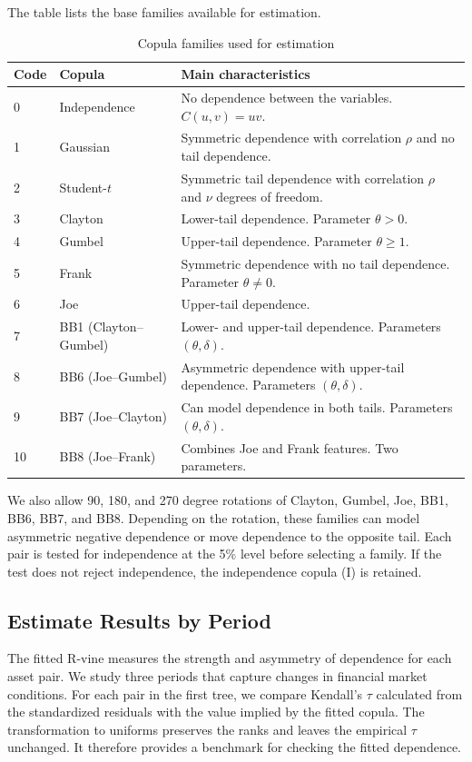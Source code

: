 \documentclass[12pt,a4paper]{article}
\begin{document}
The table lists the base families available for estimation.

\begin{table}[H]
\centering
\small
\begin{tabular}{llp{8cm}}
\toprule
Code & Copula & Main characteristics \\
\midrule
0 & Independence & No dependence between the variables. $C(u,v)=uv$. \\
1 & Gaussian & Symmetric dependence with correlation $\rho$ and no tail dependence. \\
2 & Student-$t$ & Symmetric tail dependence with correlation $\rho$ and $\nu$ degrees of freedom. \\
3 & Clayton & Lower-tail dependence. Parameter $\theta>0$. \\
4 & Gumbel & Upper-tail dependence. Parameter $\theta\geq1$. \\
5 & Frank & Symmetric dependence with no tail dependence. Parameter $\theta\neq0$. \\
6 & Joe & Upper-tail dependence. \\
7 & BB1 (Clayton--Gumbel) & Lower- and upper-tail dependence. Parameters $(\theta,\delta)$. \\
8 & BB6 (Joe--Gumbel) & Asymmetric dependence with upper-tail dependence. Parameters $(\theta,\delta)$. \\
9 & BB7 (Joe--Clayton) & Can model dependence in both tails. Parameters $(\theta,\delta)$. \\
10 & BB8 (Joe--Frank) & Combines Joe and Frank features. Two parameters. \\
\bottomrule
\end{tabular}
\caption{Copula families used for estimation}
\end{table}

We also allow 90, 180, and 270 degree rotations of Clayton, Gumbel, Joe, BB1, BB6, BB7, and BB8. Depending on the rotation, these families can model asymmetric negative dependence or move dependence to the opposite tail. Each pair is tested for independence at the 5\% level before selecting a family. If the test does not reject independence, the independence copula (I) is retained.

\subsection{Estimate Results by Period}

The fitted R-vine measures the strength and asymmetry of dependence for each asset pair. We study three periods that capture changes in financial market conditions.
For each pair in the first tree, we compare Kendall's $\tau$ calculated from the standardized residuals with the value implied by the fitted copula. The transformation to uniforms preserves the ranks and leaves the empirical $\tau$ unchanged. It therefore provides a benchmark for checking the fitted dependence.
\end{document}
